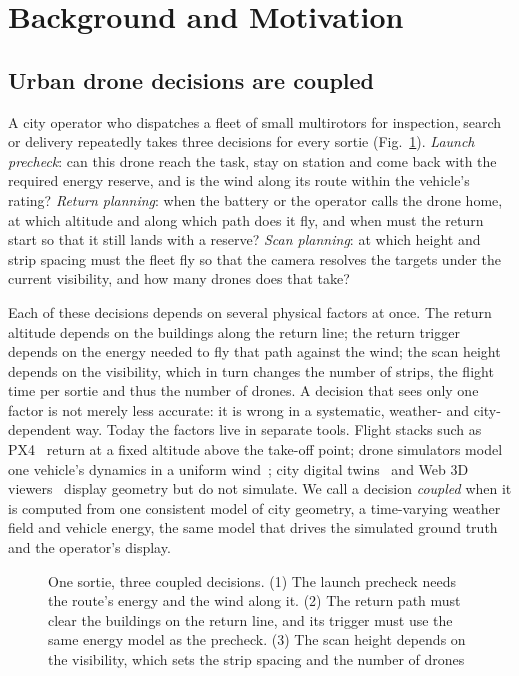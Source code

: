 \section{Background and Motivation}\label{sec:background}

\subsection{Urban drone decisions are coupled}\label{sec:bg:coupled}

A city operator who dispatches a fleet of small multirotors for inspection, search or delivery repeatedly takes three
decisions for every sortie (Fig.~\ref{fig:scene}).
\emph{Launch precheck}: can this drone reach the task, stay on station and come back with the required energy reserve,
and is the wind along its route within the vehicle's rating?
\emph{Return planning}: when the battery or the operator calls the drone home, at which altitude and along which path
does it fly, and when must the return start so that it still lands with a reserve?
\emph{Scan planning}: at which height and strip spacing must the fleet fly so that the camera resolves the targets
under the current visibility, and how many drones does that take?

Each of these decisions depends on several physical factors at once. The return altitude depends on the buildings
along the return line; the return trigger depends on the energy needed to fly that path against the wind; the scan
height depends on the visibility, which in turn changes the number of strips, the flight time per sortie and thus the
number of drones. A decision that sees only one factor is not merely less accurate: it is wrong in a systematic,
weather- and city-dependent way. Today the factors live in separate tools. Flight stacks such as
PX4~\cite{meier2015px4} return at a fixed altitude above the take-off point; drone simulators model one
vehicle's dynamics in a uniform wind~\cite{shah2017airsim,koenig2004gazebo}; city digital
twins~\cite{batty2018digitaltwins,ketzler2020digitaltwins,shahat2021citydigitaltwin} and Web 3D viewers~\cite{ogc2023_3dtiles,schuetz2020octree}
display geometry but do not simulate. We call a decision \emph{coupled} when it is computed from one consistent model of
city geometry, a time-varying weather field and vehicle energy, the same model that drives the simulated ground truth
and the operator's display.

\begin{figure}[t]
\centering
\resizebox{\textwidth}{!}{}
\caption{One sortie, three coupled decisions. (1) The launch precheck needs the route's energy and the wind along it.
(2) The return path must clear the buildings on the return line, and its trigger must use the same energy model as the
precheck. (3) The scan height depends on the visibility, which sets the strip spacing and the number of drones}
\label{fig:scene}
\end{figure}

